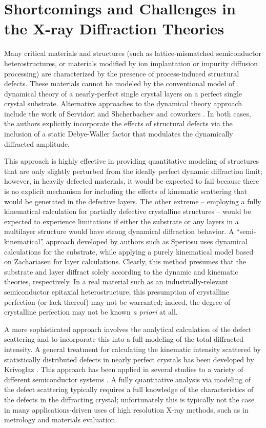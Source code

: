 	\section{Shortcomings and Challenges in the X-ray Diffraction Theories}


Many critical materials and structures (such as lattice-mismatched semiconductor heterostructures, or materials modified by ion implantation or impurity diffusion processing) are characterized by the presence of process-induced structural defects.  These materials cannot be modeled by the conventional model of dynamical theory of a nearly-perfect single crystal layers on a perfect single crystal substrate. Alternative approaches to the dynamical theory approach include the work of Servidori \cite{Servidori1} and Shcherbachev and coworkers \cite{Shcher1}.  In both cases, the authors explicitly incorporate the effects of structural defects via the inclusion of a static Debye-Waller factor that modulates the dynamically diffracted amplitude. 

This approach is highly effective in providing quantitative modeling of structures that are only slightly perturbed from the ideally perfect dynamic diffraction limit; however, in heavily defected materials, it would be expected to fail because there is no explicit mechanism for including the effects of kinematic scattering that would be generated in the defective layers.  The other extreme -- employing a fully kinematical calculation for partially defective crystalline structures -- would be expected to experience limitations if either the substrate or any layers in a multilayer structure would have strong dynamical diffraction behavior.  A ``semi-kinematical'' approach developed by authors such as Speriosu \cite{Speriosu2,Speriosu1} uses dynamical calculations for the substrate, while applying a purely kinematical model based on Zachariasen  \cite{Zachariasen1} for layer calculations. Clearly, this method presumes that the substrate and layer diffract solely according to the dynamic and kinematic theories, respectively. In a real material such as an industrially-relevant semiconductor epitaxial heterostructure, this presumption of crystalline perfection (or lack thereof) may not be warranted; indeed, the degree of crystalline perfection may not be known \textit{a priori} at all.

A more sophisticated approach involves the analytical calculation of the defect scattering and to incorporate this into a full modeling of the total diffracted intensity. A general treatment for calculating the kinematic intensity scattered by statistically distributed defects in nearly perfect crystals has been developed by Krivoglaz \cite{Krivoglaz1}. This approach has been applied in several studies to a variety of different semiconductor systems \cite{Gartstein1,Zaumseil1,Kaganer1,Holy3}. A fully quantitative analysis via modeling of the defect scattering typically requires a full knowledge of the characteristics of the defects in the diffracting crystal; unfortunately this is typically not the case in many applications-driven uses of high resolution X-ray methods, such as in metrology and materials evaluation. 


